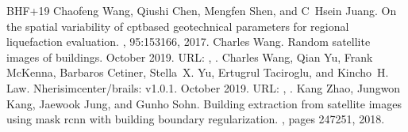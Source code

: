 \documentclass[letterpaper,10pt,english]{sphinxmanual}
\begin{document}
\begin{sphinxthebibliography}{BHF+19}
\sphinxAtStartPar
Chaofeng Wang, Qiushi Chen, Mengfen Shen, and C Hsein Juang. On the spatial variability of cpt\sphinxhyphen{}based geotechnical parameters for regional liquefaction evaluation. , 95:153\textendash{}166, 2017.
\sphinxAtStartPar
Charles Wang. Random satellite images of buildings. October 2019. URL: , .
\sphinxAtStartPar
Charles Wang, Qian Yu, Frank McKenna, Barbaros Cetiner, Stella X. Yu, Ertugrul Taciroglu, and Kincho H. Law. Nheri\sphinxhyphen{}simcenter/brails: v1.0.1. October 2019. URL: , .
\sphinxAtStartPar
Kang Zhao, Jungwon Kang, Jaewook Jung, and Gunho Sohn. Building extraction from satellite images using mask r\sphinxhyphen{}cnn with building boundary regularization. , pages 247\textendash{}251, 2018.
\end{sphinxthebibliography}



\renewcommand{\indexname}{Index}
\printindex
\end{document}
